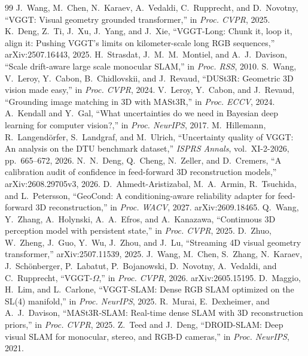 \documentclass[11pt, a4paper]{article}
\begin{document}
\FloatBarrier
\begin{thebibliography}{99}
\small
\setlength{\itemsep}{0pt}
 J.~Wang, M.~Chen, N.~Karaev, A.~Vedaldi, C.~Rupprecht, and D.~Novotny, ``VGGT: Visual geometry grounded
transformer,'' in \emph{Proc. CVPR}, 2025.
 K.~Deng, Z.~Ti, J.~Xu, J.~Yang, and J.~Xie, ``VGGT-Long: Chunk it, loop it, align it: Pushing VGGT's
limits on kilometer-scale long RGB sequences,'' arXiv:2507.16443, 2025.
 H.~Strasdat, J.~M.~M.~Montiel, and A.~J.~Davison, ``Scale drift-aware large scale monocular SLAM,'' in
\emph{Proc. RSS}, 2010.
 S.~Wang, V.~Leroy, Y.~Cabon, B.~Chidlovskii, and J.~Revaud, ``DUSt3R: Geometric 3D vision made easy,'' in
\emph{Proc. CVPR}, 2024.
 V.~Leroy, Y.~Cabon, and J.~Revaud, ``Grounding image matching in 3D with MASt3R,'' in \emph{Proc. ECCV},
2024.
 A.~Kendall and Y.~Gal, ``What uncertainties do we need in Bayesian deep learning for computer vision?,''
in \emph{Proc. NeurIPS}, 2017.
 M.~Hillemann, R.~Langend\"orfer, S.~Landgraf, and M.~Ulrich, ``Uncertainty quality of VGGT: An analysis
on the DTU benchmark dataset,'' \emph{ISPRS Annals}, vol.~XI-2-2026, pp.~665--672, 2026.
 N.~N.~Deng, Q.~Cheng, N.~Zeller, and D.~Cremers, ``A calibration audit of confidence in feed-forward 3D
reconstruction models,'' arXiv:2608.29705v3, 2026.
 D.~Ahmedt-Aristizabal, M.~A.~Armin, R.~Tsuchida, and L.~Petersson, ``GeoCond: A conditioning-aware
reliability adapter for feed-forward 3D reconstruction,'' in \emph{Proc. WACV}, 2027. arXiv:2609.18465.
 Q.~Wang, Y.~Zhang, A.~Holynski, A.~A.~Efros, and A.~Kanazawa, ``Continuous 3D perception model with
persistent state,'' in \emph{Proc. CVPR}, 2025.
 D.~Zhuo, W.~Zheng, J.~Guo, Y.~Wu, J.~Zhou, and J.~Lu, ``Streaming 4D visual geometry transformer,''
arXiv:2507.11539, 2025.
 J.~Wang, M.~Chen, S.~Zhang, N.~Karaev, J.~Sch\"onberger, P.~Labatut, P.~Bojanowski, D.~Novotny,
A.~Vedaldi, and C.~Rupprecht, ``VGGT-$\Omega$,'' in \emph{Proc. CVPR}, 2026. arXiv:2605.15195.
 D.~Maggio, H.~Lim, and L.~Carlone, ``VGGT-SLAM: Dense RGB SLAM optimized on the SL(4) manifold,'' in
\emph{Proc. NeurIPS}, 2025.
 R.~Murai, E.~Dexheimer, and A.~J.~Davison, ``MASt3R-SLAM: Real-time dense SLAM with 3D reconstruction
priors,'' in \emph{Proc. CVPR}, 2025.
 Z.~Teed and J.~Deng, ``DROID-SLAM: Deep visual SLAM for monocular, stereo, and RGB-D cameras,'' in
\emph{Proc. NeurIPS}, 2021.

\end{thebibliography}
\end{document}
